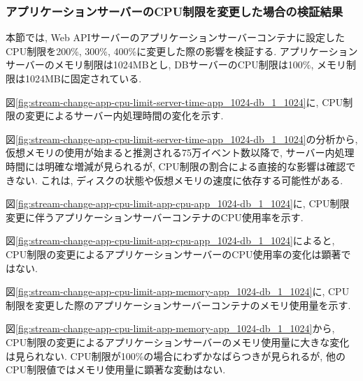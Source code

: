 \documentclass[../../../../main]{subfiles}
\begin{document}
    \subsubsection{アプリケーションサーバーのCPU制限を変更した場合の検証結果}\label{subsubsec:result-streaming-change-app-cpu}

    本節では, Web APIサーバーのアプリケーションサーバーコンテナに設定したCPU制限を200\%, 300\%, 400\%に変更した際の影響を検証する. アプリケーションサーバーのメモリ制限は1024MBとし, DBサーバーのCPU制限は100\%, メモリ制限は1024MBに固定されている.


    図\ref{fig:stream-change-app-cpu-limit-server-time-app_1024-db_1_1024}に, CPU制限の変更によるサーバー内処理時間の変化を示す.

    

    図\ref{fig:stream-change-app-cpu-limit-server-time-app_1024-db_1_1024}の分析から, 仮想メモリの使用が始まると推測される75万イベント数以降で, サーバー内処理時間には明確な増減が見られるが, CPU制限の割合による直接的な影響は確認できない. これは, ディスクの状態や仮想メモリの速度に依存する可能性がある.


    図\ref{fig:stream-change-app-cpu-limit-app-cpu-app_1024-db_1_1024}に, CPU制限変更に伴うアプリケーションサーバーコンテナのCPU使用率を示す.

    

    図\ref{fig:stream-change-app-cpu-limit-app-cpu-app_1024-db_1_1024}によると, CPU制限の変更によるアプリケーションサーバーのCPU使用率の変化は顕著ではない.


    図\ref{fig:stream-change-app-cpu-limit-app-memory-app_1024-db_1_1024}に, CPU制限を変更した際のアプリケーションサーバーコンテナのメモリ使用量を示す.

    

    図\ref{fig:stream-change-app-cpu-limit-app-memory-app_1024-db_1_1024}から, CPU制限の変更によるアプリケーションサーバーのメモリ使用量に大きな変化は見られない. CPU制限が100\%の場合にわずかなばらつきが見られるが, 他のCPU制限値ではメモリ使用量に顕著な変動はない.

\end{document}
